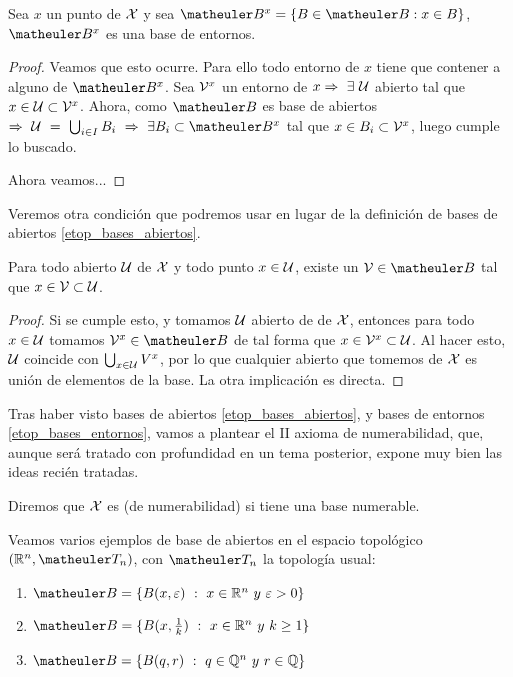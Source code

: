\begin{prop}
	Sea $x$ un punto de $\mathcal{X}$ y sea $\B^{x} = \{B \in \B : x \in B\}$, $\B^{x}$ es una base de entornos.
\end{prop}
\begin{proof} Veamos que esto ocurre. Para ello todo entorno de $x$ tiene que contener a alguno de $\B^{x}$. Sea $\mathcal{V}^{x}$ un entorno de $x \Rightarrow\ \exists\ \mathcal{U}$ abierto tal que $x \in \mathcal{U} \subset \mathcal{V}^{x}$. Ahora, como $\B$ es base de abiertos $\ra\ \U\ =\ \bigcup_{i\in I}B_i\ \ra\ \exists B_{i} \subset \B^{x}$ tal que $x \in B_{i} \subset \mathcal{V}^{x}$, luego cumple lo buscado.
	
	
	Ahora veamos...%
\end{proof}

Veremos otra condición que podremos usar en lugar de la definición de bases de abiertos \ref{etop_bases_abiertos}.
\begin{obs}
	\label{etop_ref_bases_abiertos}
	Para todo abierto $\mathcal{U}$ de $\mathcal{X}$ y todo punto $x \in \mathcal{U}$, existe un $\V \in \B$ tal que $x \in \mathcal{V} \subset \mathcal{U}$.
\end{obs}
\begin{proof}
	Si se cumple esto, y tomamos $\mathcal{U}$ abierto de de $\mathcal{X}$, entonces para todo $x \in \mathcal{U}$ tomamos $\V^x \in \B$ de tal forma que $x \in \mathcal{V}^x \subset \mathcal{U}$. Al hacer esto, $\mathcal{U}$ coincide con $\bigcup_{x \in \mathcal{U}}V^{x}$, por lo que cualquier abierto que tomemos de $\mathcal{X}$ es unión de elementos de la base. La otra implicación es directa.
\end{proof}
Tras haber visto bases de abiertos \ref{etop_bases_abiertos}, y bases de entornos \ref{etop_bases_entornos}, vamos a plantear el II axioma de numerabilidad, que, aunque será tratado con profundidad en un tema posterior, expone muy bien las ideas recién tratadas.
\begin{defi}
	\label{etop_2_axioma_num}
	Diremos que $\mathcal{X}$ es  (de numerabilidad) si tiene una base numerable.
	\begin{exa}
		Veamos varios ejemplos de base de abiertos en el espacio topológico $(\R^{n},\T_{n})$, con $\T_{n}$ la topología usual:
		\begin{enumerate}
			\item $\B=\{B(x, \varepsilon)\ :\ x \in \R^n\ y \ \varepsilon > 0\}$
			\item $\B=\{B(x, \frac{1}{k})\ :\ x \in \R^n\ y \ k \geq 1\}$
			\item $\B=\{B(q, r)\ :\ q \in \Q^n\ y \ r \in \Q\}$
		\end{enumerate}
	\end{exa}
\end{defi}
